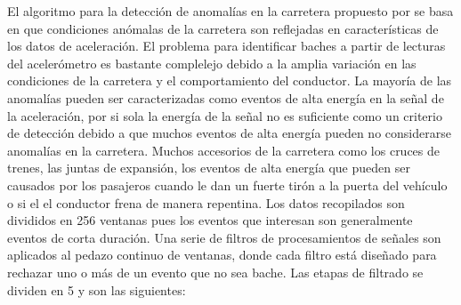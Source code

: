 
El algoritmo para la detección de anomalías en la carretera propuesto por \cite{eriksson2008pothole} se basa en que condiciones anómalas de la carretera
son reflejadas en características de los datos de aceleración. El problema para identificar baches a partir de lecturas del acelerómetro es bastante 
complelejo debido a la amplia variación en las condiciones de la carretera y el comportamiento del conductor. La mayoría de las anomalías pueden ser 
caracterizadas como eventos de alta energía en la señal de la aceleración, por si sola la energía de la señal no es suficiente como un criterio de 
detección debido a que muchos eventos de alta energía pueden no considerarse anomalías en la carretera. Muchos accesorios de la carretera como 
los cruces de trenes, las juntas de expansión, los eventos de alta energía que pueden ser causados por los pasajeros cuando le dan un fuerte 
tirón a la puerta del vehículo o si el el conductor frena de manera repentina. Los datos recopilados son divididos en 256 ventanas pues 
los eventos que interesan son generalmente eventos de corta duración. Una serie de filtros de procesamientos de señales son aplicados 
al  pedazo continuo de ventanas, donde cada filtro está diseñado para rechazar uno o más de un evento que no sea bache. 
Las etapas de filtrado se dividen en 5 y son las siguientes:

